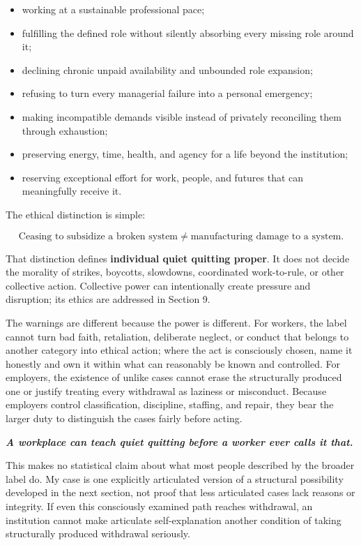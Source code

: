 \documentclass[11pt,oneside]{article}
\providecommand{\tightlist}{%
  \setlength{\itemsep}{0.22em}\setlength{\parskip}{0pt}}
\renewenvironment{quote}
  {\begin{tcolorbox}[
      enhanced,
      breakable,
      colback=ManifestLight,
      colframe=ManifestRule,
      boxrule=0pt,
      leftrule=3pt,
      arc=0pt,
      outer arc=0pt,
      left=10pt,right=10pt,top=8pt,bottom=8pt,
      before skip=0.8em,after skip=0.8em
    ]\itshape}
  {\end{tcolorbox}}
\begin{document}
\begin{itemize}
\tightlist
\item
  working at a sustainable professional pace;
\item
  fulfilling the defined role without silently absorbing every missing
  role around it;
\item
  declining chronic unpaid availability and unbounded role expansion;
\item
  refusing to turn every managerial failure into a personal emergency;
\item
  making incompatible demands visible instead of privately reconciling
  them through exhaustion;
\item
  preserving energy, time, health, and agency for a life beyond the
  institution;
\item
  reserving exceptional effort for work, people, and futures that can
  meaningfully receive it.
\end{itemize}

The ethical distinction is simple:

\[
\boxed{\text{Ceasing to subsidize a broken system} \neq \text{manufacturing damage to a system}.}
\]

That distinction defines \textbf{individual quiet quitting proper}. It
does not decide the morality of strikes, boycotts, slowdowns,
coordinated work-to-rule, or other collective action. Collective power
can intentionally create pressure and disruption; its ethics are
addressed in Section 9.

The warnings are different because the power is different. For workers,
the label cannot turn bad faith, retaliation, deliberate neglect, or
conduct that belongs to another category into ethical action; where the
act is consciously chosen, name it honestly and own it within what can
reasonably be known and controlled. For employers, the existence of
unlike cases cannot erase the structurally produced one or justify
treating every withdrawal as laziness or misconduct. Because employers
control classification, discipline, staffing, and repair, they bear the
larger duty to distinguish the cases fairly before acting.

\begin{quote}
\textbf{A workplace can teach quiet quitting before a worker ever calls
it that.}
\end{quote}

This makes no statistical claim about what most people described by the
broader label do. My case is one explicitly articulated version of a
structural possibility developed in the next section, not proof that
less articulated cases lack reasons or integrity. If even this
consciously examined path reaches withdrawal, an institution cannot make
articulate self-explanation another condition of taking structurally
produced withdrawal seriously.
\end{document}
